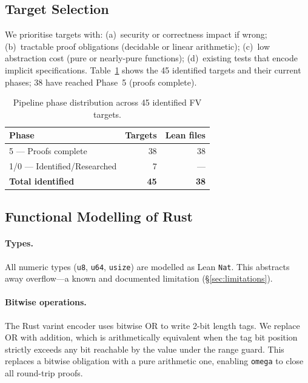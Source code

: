 \documentclass[sigconf,10pt]{acmart}
\begin{document}
\subsection{Target Selection}

We prioritise targets with: (a)~security or correctness impact if wrong;
(b)~tractable proof obligations (decidable or linear arithmetic);
(c)~low abstraction cost (pure or nearly-pure functions);
(d)~existing tests that encode implicit specifications.
Table~\ref{tab:targets-overview} shows the 45 identified targets and their
current phases; 38 have reached Phase~5 (proofs complete).

\begin{table}[h]
\centering\small
\begin{tabular}{lrr}
\toprule
\textbf{Phase} & \textbf{Targets} & \textbf{Lean files} \\
\midrule
5 — Proofs complete      & 38 & 38 \\
1/0 — Identified/Researched & 7 & — \\
\midrule
\textbf{Total identified} & \textbf{45} & \textbf{38} \\
\bottomrule
\end{tabular}
\caption{Pipeline phase distribution across 45 identified FV targets.}
\label{tab:targets-overview}
\end{table}

\subsection{Functional Modelling of Rust}

\paragraph{Types.}
All numeric types (\texttt{u8}, \texttt{u64}, \texttt{usize}) are modelled
as Lean \texttt{Nat}.
This abstracts away overflow---a known and documented limitation
(\S\ref{sec:limitations}).

\paragraph{Bitwise operations.}
The Rust varint encoder uses bitwise OR to write 2-bit length tags.
We replace OR with addition, which is arithmetically equivalent when the
tag bit position strictly exceeds any bit reachable by the value under the
range guard.
This replaces a bitwise obligation with a pure arithmetic one, enabling
\texttt{omega} to close all round-trip proofs.
\end{document}
